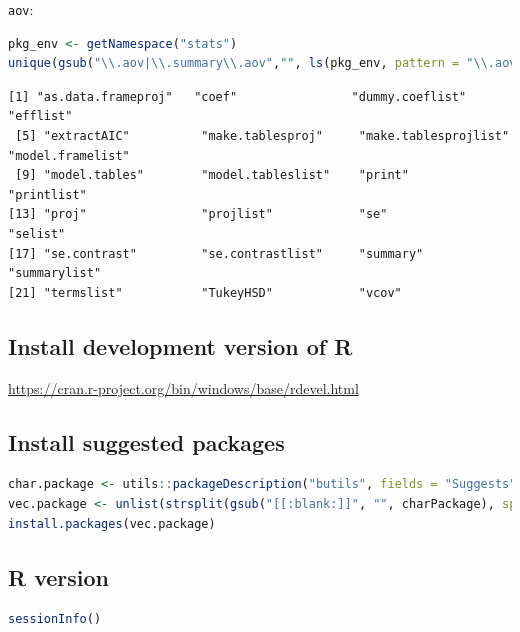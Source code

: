 \documentclass{article}
\begin{document}
\texttt{aov}:
\begin{lstlisting}[language=r,numbers=none]
pkg_env <- getNamespace("stats")
unique(gsub("\\.aov|\\.summary\\.aov","", ls(pkg_env, pattern = "\\.aov|\\.summary\\.aov")))
\end{lstlisting}

\label{}
\begin{verbatim}
[1] "as.data.frameproj"   "coef"                "dummy.coeflist"      "efflist"            
 [5] "extractAIC"          "make.tablesproj"     "make.tablesprojlist" "model.framelist"    
 [9] "model.tables"        "model.tableslist"    "print"               "printlist"          
[13] "proj"                "projlist"            "se"                  "selist"             
[17] "se.contrast"         "se.contrastlist"     "summary"             "summarylist"        
[21] "termslist"           "TukeyHSD"            "vcov"
\end{verbatim}
\subsection{Install development version of R}
\label{sec:org315e131}
\url{https://cran.r-project.org/bin/windows/base/rdevel.html}
\subsection{Install suggested packages}
\label{sec:orgb7c7671}

\begin{lstlisting}[language=r,numbers=none]
char.package <- utils::packageDescription("butils", fields = "Suggests")
vec.package <- unlist(strsplit(gsub("[[:blank:]]", "", charPackage), split = ","))
install.packages(vec.package)
\end{lstlisting}
\subsection{R version}
\label{sec:orgeb84d04}

\begin{lstlisting}[language=r,numbers=none]
sessionInfo()
\end{lstlisting}
\end{document}
